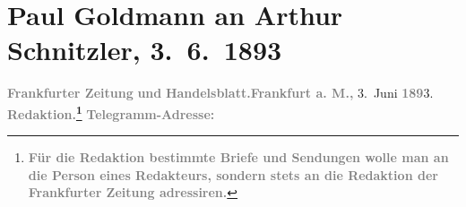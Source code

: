 

         
         \renewcommand{\erwaehntePersonen}{Personen: Richard Beer-Hofmann, Kurt Eisner, Paul Goldmann, Hugo von Hofmannsthal, Fedor Mamroth, Vally Rosengart, Josef Rosengart, August Stein}
         \renewcommand{\erwaehnteInstitutionen}{Institutionen: Frankfurter Zeitung, S. Fischer Verlag}
         \renewcommand{\erwaehnteOrte}{Orte: Berlin, Frankfurt am Main, Laupheim, Paris, Wien}
         \renewcommand{\erwaehnteWerke}{Werke: Anatol, Das Märchen. Schauspiel in drei Aufzügen, Frankfurter Zeitung, Neue Deutsche Rundschau, Sterben. Novelle}
               \section[Paul Goldmann an Arthur Schnitzler, 3. 6. 1893]{ Paul Goldmann an Arthur Schnitzler, 3. 6. 1893}\nopagebreak{}\rehead{ }\begin{ledgroupsized}[t]{13cm}\normalsize\beginnumbering \toendnotes[C]{\smallbreak\pagebreak[2]} 
\toendnotes[C]{\smallbreak}\pstart
           \noindent{}{\pb}\textcolor{gray}{\textbf{\textbf{Frankfurter Zeitung}}}\pend
           \pstart
           \textcolor{gray}{\textbf{und}}\pend
           \pstart
           \textcolor{gray}{\textbf{\textbf{Handelsblatt}.}}\hfill \textcolor{gray}{\textbf{Frankfurt a. M.,}}{ }3. Juni \textcolor{gray}{\textbf{189}}3.\pend
           \pstart
           \textcolor{gray}{\textbf{\textbf{Redaktion.}\footnote{\noindent{}\textcolor{gray}{\textbf{Für die Redaktion bestimmte Briefe und Sendungen wolle
                              man  an die Person eines Redakteurs,
                              sondern stets \textbf{an die Redaktion der Frankfurter Zeitung} adressiren.}}}}}\pend
           \pstart
           \textcolor{gray}{\textbf{\textbf{Telegramm-Adresse:}}}\pend

\end{ledgroupsized}
